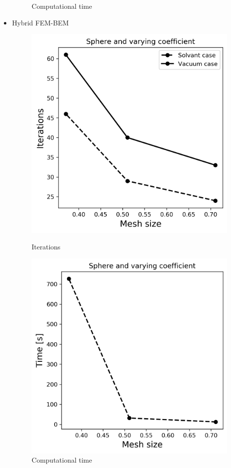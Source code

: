 \begin{itemize}
\begin{figure}[!htb]
  \caption{Computational time}
\endminipage
\end{figure}
        \item Hybrid FEM-BEM
\begin{figure}[!htb]
  \includegraphics[width=\linewidth]{Hybrid_FEM_BEM_Sphere_varying_coeff_iter.png}
  \caption{Iterations}
\endminipage\hfill
{}%
  \includegraphics[width=\linewidth]{Hybrid_FEM_BEM_Sphere_varying_coeff_time.png}
  \caption{Computational time}
\endminipage
\end{figure}
    \end{itemize}

